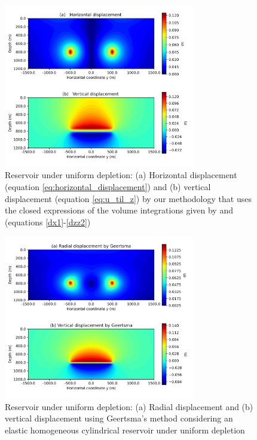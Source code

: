 \documentclass[journal abbreviation, manuscript]{copernicus}
\begin{document}
\begin{figure}[ht]
\includegraphics[width=8.3cm]{Fig/Figure_Displacement.png}
\caption{Reservoir under uniform depletion: (a) Horizontal displacement (equation \ref{eq:horizontal_displacement}) and (b) vertical displacement (equation \ref{eq:u_til_z}) by our methodology that uses the closed expressions of the volume integrations given by \cite{Nagyetal2000} and \cite{Nagyetal2002} (equations \ref{dx1}-\ref{dzz2})}
\label{fig:displacement}
\end{figure}

\begin{figure}[h]
\includegraphics[width=8.3cm]{Fig/Figure_Displacement_Geertsma.png}
\caption{Reservoir under uniform depletion: (a) Radial displacement and (b) vertical displacement using Geertsma’s method \citep{Geertsma73}  considering an elastic homogeneous cylindrical reservoir under uniform depletion \citep{Fjaer08}}
\label{fig:displacement_Geertsma}
\end{figure}
\end{document}
